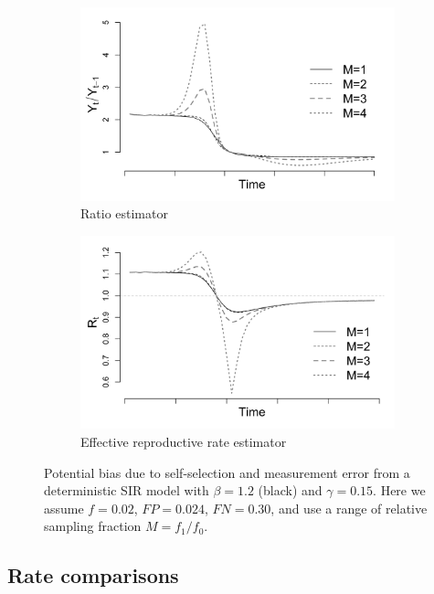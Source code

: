 \documentclass[11pt]{amsart}
\numberwithin{equation}{section}
\theoremstyle{plain}
\begin{document}
\begin{figure}
\centering
\begin{subfigure}{.5\textwidth}
 \centering
 \includegraphics[width=.9\linewidth]{../figs/sir_ratio.png}
 \caption{Ratio estimator}
 \label{fig:ratio-bias}
\end{subfigure}%
\begin{subfigure}{.5\textwidth}
 \centering
 \includegraphics[width=.9\linewidth]{../figs/sir_rt.png}
 \caption{Effective reproductive rate estimator}
 \label{fig:r0-bias}
\end{subfigure}
\caption{Potential bias due to self-selection and measurement error from a deterministic SIR model with $\beta = 1.2$ (black) and $\gamma = 0.15$.  Here we assume $f = 0.02$, $FP = 0.024$, $FN = 0.30$, and use a range of relative sampling fraction $M = f_1/f_0$.}
\label{fig:rates}
\end{figure}

\subsection{Rate comparisons}
\end{document}
